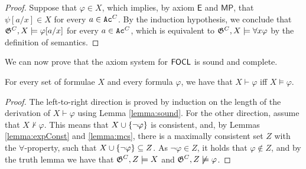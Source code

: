 \documentclass[sigconf,anonymous]{aamas}
\begin{document}
\begin{proof}
Suppose that $\varphi\in X$, which implies, by axiom $\mathsf{E}$ and $\mathsf{MP}$, that $\psi[a/x] \in X$ for every $a\in \texttt{Ac}^C$. By the induction hypothesis, we conclude that $\mathfrak{G}^C,X\models \varphi [a/x]$ for every $a\in \texttt{Ac}^C$, which is equivalent to $\mathfrak{G}^C,X\models \forall x \varphi$ by the definition of semantics. 
\end{proof}

We can now prove that the axiom system for $\mathsf{FOCL}$ is sound and complete.
\begin{theorem}
    For every set of formulae $X$ and every formula $\varphi$, we have that $X\vdash \varphi$ iff $X\models \varphi$.
\end{theorem}
\begin{proof}
    The left-to-right direction is proved by induction on the length of the derivation of $X\vdash \varphi$ using Lemma \ref{lemma:sound}. For the other direction, assume that $X\not\vdash \varphi$. This means that $X\cup\{\neg\varphi\}$ is consistent, and, by Lemmas \ref{lemma:expConst} and \ref{lemma:mcs}, there is a maximally consistent set $Z$ with the $\forall$-property, such that $X\cup\{\neg\varphi\} \subseteq Z$. As $\neg\varphi \in Z$, it holds that $\varphi\notin Z$, and by the truth lemma we have that $\mathfrak{G}^C,Z\models X$ and $\mathfrak{G}^C,Z\not\models \varphi$.  
\end{proof}
\end{document}
